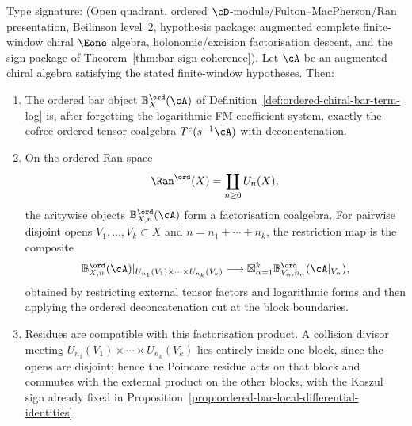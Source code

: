 \begin{proposition}
\label{prop:ordered-bar-carrier-ran-factorisation}
Type signature: \textup{(}Open quadrant, ordered
$\cD$-module/Fulton--MacPherson/Ran presentation, Beilinson level~$2$,
hypothesis package: augmented complete finite-window chiral
$\Eone$ algebra, holonomic/excision factorisation descent, and the sign package of
Theorem~\ref{thm:bar-sign-coherence}\textup{)}.
Let $\cA$ be an augmented chiral algebra satisfying the stated
finite-window hypotheses. Then:
\begin{enumerate}[label=\textup{(\roman*)}]
\item The ordered bar object
$\mathbb B_X^{\ord}(\cA)$ of
Definition~\ref{def:ordered-chiral-bar-term-log} is, after forgetting
the logarithmic FM coefficient system, exactly the cofree ordered
tensor coalgebra
$T^c(s^{-1}\bar\cA)$ with deconcatenation.
\item On the ordered Ran space
\[
\Ran^{\ord}(X)=\coprod_{n\ge0}U_n(X),
\]
the aritywise objects $\mathbb B^{\ord}_{X,n}(\cA)$ form a
factorisation coalgebra. For pairwise disjoint opens
$V_1,\ldots,V_k\subset X$ and $n=n_1+\cdots+n_k$, the restriction map is
the composite
\[
\mathbb B^{\ord}_{X,n}(\cA)|_{U_{n_1}(V_1)\times\cdots\times U_{n_k}(V_k)}
\longrightarrow
\boxtimes_{\alpha=1}^k
\mathbb B^{\ord}_{V_\alpha,n_\alpha}(\cA|_{V_\alpha}),
\]
obtained by restricting external tensor factors and logarithmic forms
and then applying the ordered deconcatenation cut at the block
boundaries.
\item Residues are compatible with this factorisation product. A
collision divisor meeting
$U_{n_1}(V_1)\times\cdots\times U_{n_k}(V_k)$ lies entirely inside one
block, since the opens are disjoint; hence the Poincare residue acts
on that block and commutes with the external product on the other
blocks, with the Koszul sign already fixed in
Proposition~\ref{prop:ordered-bar-local-differential-identities}.
\end{enumerate}
\end{proposition}


